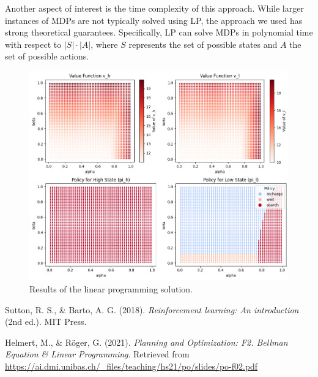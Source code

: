 \documentclass[12pt,a4paper]{article}
\begin{document}
Another aspect of interest is the time complexity of this approach. While larger instances of MDPs are not typically solved using LP, the approach we used has strong theoretical guarantees. Specifically, LP can solve MDPs in polynomial time with respect to \( |S| \cdot |A| \), where \(S\) represents the set of possible states and \(A\) the set of possible actions.

\begin{figure}[h!]
    \centering
    \includegraphics[width=\textwidth]{fig1.png} %
    \caption{Results of the linear programming solution.}
    \label{fig:results}
\end{figure}

\begin{thebibliography}{99}

Sutton, R. S., \& Barto, A. G. (2018). \textit{Reinforcement learning: An introduction} (2nd ed.). MIT Press.


Helmert, M., \& Röger, G. (2021). \textit{Planning and Optimization: F2. Bellman Equation \& Linear Programming}. Retrieved from \url{https://ai.dmi.unibas.ch/_files/teaching/hs21/po/slides/po-f02.pdf}

\end{thebibliography}
\end{document}

